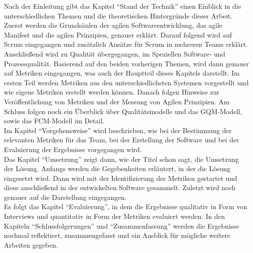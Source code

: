 Nach der Einleitung gibt das Kapitel ``Stand der Technik'' einen Einblick in die unterschiedlichen Themen und die theoretischen Hintergründe dieser Arbeit.
Zuerst werden die Grundsäulen der agilen Softwareentwicklung, das agile Manifest und die agilen Prinzipien, genauer erklärt.
Darauf folgend wird auf Scrum eingegangen und zusätzlich Ansätze für Scrum in mehreren Teams erklärt.
Anschließend wird zu Qualität übergegangen, im Speziellen Software- und Prozessqualität.
Basierend auf den beiden vorherigen Themen, wird dann genauer auf Metriken eingegangen, was auch der Hauptteil dieses Kapitels darstellt.
Im ersten Teil werden Metriken aus den unterschiedlichsten Systemen vorgestellt und wie eigene Metriken erstellt werden können.
Danach folgen Hinweise zur Veröffentlichung von Metriken und der Messung von Agilen Prinzipien.
Am Schluss folgen noch ein Überblick über Qualitätsmodelle und das \ac{GQM}-Modell, sowie das \ac{FCM}-Modell im Detail.
\\
Im Kapitel ``Vorgehensweise'' wird beschrieben, wie bei der Bestimmung der relevanten Metriken für das Team, bei der Erstellung der Software und bei der Evaluierung der Ergebnisse vorgegangen wird.
\\
Das Kapitel ``Umsetzung'' zeigt dann, wie der Titel schon sagt, die Umsetzung der Lösung.
Anfangs werden die Gegebenheiten erläutert, in der die Lösung eingesetzt wird.
Dann wird mit der Identifizierung der Metriken gestartet und diese anschließend in der entwickelten Software gesammelt.
Zuletzt wird noch genauer auf die Darstellung eingegangen.
\\
Es folgt das Kapitel ``Evaluierung'', in dem die Ergebnisse qualitativ in Form von Interviews und quantitativ in Form der Metriken evaluiert werden.
In den Kapiteln ``Schlussfolgerungen'' und ``Zusammenfassung'' werden die Ergebnisse nochmal reflektiert, zusammengefasst und ein Ausblick für mögliche weitere Arbeiten gegeben.
